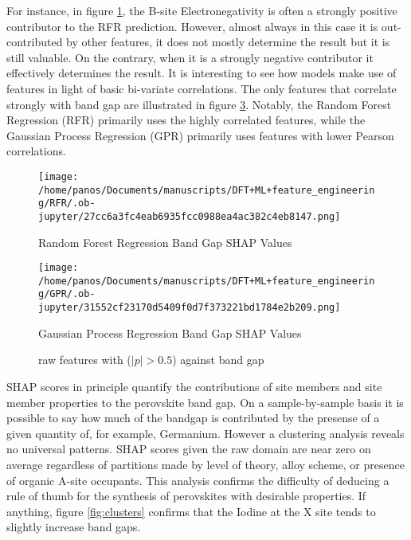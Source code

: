 For instance, in figure \ref{fig:rfrSHAP}, the B-site Electronegativity is often a strongly positive contributor to the RFR prediction.
However, almost always in this case it is out-contributed by other features, it does not mostly determine the result but it is still valuable.
On the contrary, when it is a strongly negative contributor it effectively determines the result.
It is interesting to see how models make use of features in light of basic bi-variate correlations.
The only features that correlate strongly with band gap are illustrated in figure \ref{fig:rpear}.
Notably, the Random Forest Regression (RFR) primarily uses the highly correlated features, while the Gaussian Process Regression (GPR) primarily uses features with lower Pearson correlations.

\begin{figure}[htbp]
\centering
\texttt{[image: /home/panos/Documents/manuscripts/DFT+ML+feature\_engineering/RFR/.ob-jupyter/27cc6a3fc4eab6935fcc0988ea4ac382c4eb8147.png]}
\caption{\label{fig:rfrSHAP} Random Forest Regression Band Gap SHAP Values}
\end{figure}

\begin{figure}[htbp]
\centering
\texttt{[image: /home/panos/Documents/manuscripts/DFT+ML+feature\_engineering/GPR/.ob-jupyter/31552cf23170d5409f0d7f373221bd1784e2b209.png]}
\caption{\label{fig:gprSHAP} Gaussian Process Regression Band Gap SHAP Values}
\end{figure}

 
\begin{figure}[htbp]
\centering

\caption{\label{fig:rpear} raw features with (\(|p| > 0.5\)) against band gap}
\end{figure}

SHAP scores in principle quantify the contributions of site members and site member properties to the perovskite band gap.
On a sample-by-sample basis it is possible to say how much of the bandgap is contributed by the presense of a given quantity of, for example, Germanium.
However a clustering analysis reveals no universal patterns.
SHAP scores given the raw domain are near zero on average regardless of partitions made by level of theory, alloy scheme, or presence of organic A-site occupants.
This analysis confirms the difficulty of deducing a rule of thumb for the synthesis of perovskites with desirable properties.
If anything, figure \ref{fig:clusters} confirms that the Iodine at the X site tends to slightly increase band gaps.

